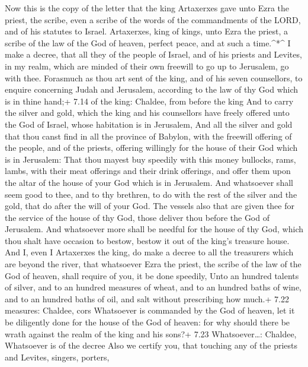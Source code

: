  Now this is the copy of the letter that the king
Artaxerxes gave unto Ezra the priest, the scribe, even a scribe of the
words of the commandments of the LORD, and of his statutes to Israel.
 Artaxerxes, king of kings, unto Ezra the priest, a scribe
of the law of the God of heaven, perfect peace, and at such a
time.\^{}*\^{}  I make a decree, that all they of the
people of Israel, and of his priests and Levites, in my realm, which are
minded of their own freewill to go up to Jerusalem, go with thee.
 Forasmuch as thou art sent of the king, and of his seven
counsellors, to enquire concerning Judah and Jerusalem, according to the
law of thy God which is in thine hand;+ 7.14 of the king: Chaldee, from
before the king  And to carry the silver and gold, which
the king and his counsellors have freely offered unto the God of Israel,
whose habitation is in Jerusalem,  And all the silver and
gold that thou canst find in all the province of Babylon, with the
freewill offering of the people, and of the priests, offering willingly
for the house of their God which is in Jerusalem:  That
thou mayest buy speedily with this money bullocks, rams, lambs, with
their meat offerings and their drink offerings, and offer them upon the
altar of the house of your God which is in Jerusalem.  And
whatsoever shall seem good to thee, and to thy brethren, to do with the
rest of the silver and the gold, that do after the will of your God.
 The vessels also that are given thee for the service of
the house of thy God, those deliver thou before the God of Jerusalem.
 And whatsoever more shall be needful for the house of thy
God, which thou shalt have occasion to bestow, bestow it out of the
king's treasure house.  And I, even I Artaxerxes the king,
do make a decree to all the treasurers which are beyond the river, that
whatsoever Ezra the priest, the scribe of the law of the God of heaven,
shall require of you, it be done speedily,  Unto an hundred
talents of silver, and to an hundred measures of wheat, and to an
hundred baths of wine, and to an hundred baths of oil, and salt without
prescribing how much.+ 7.22 measures: Chaldee, cors 
Whatsoever is commanded by the God of heaven, let it be diligently done
for the house of the God of heaven: for why should there be wrath
against the realm of the king and his sons?+ 7.23 Whatsoever\ldots:
Chaldee, Whatsoever is of the decree  Also we certify you,
that touching any of the priests and Levites, singers, porters,
